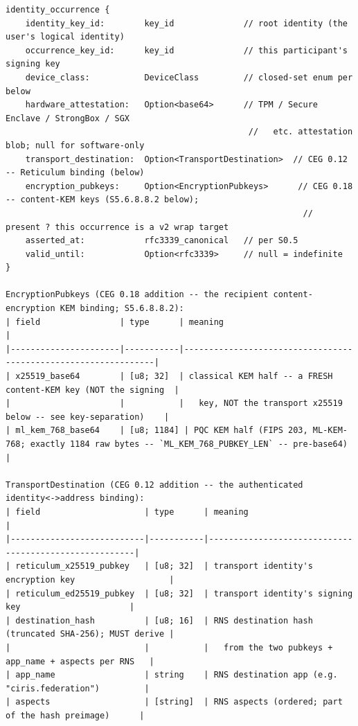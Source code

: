 \documentclass[11pt]{article}
\begin{document}
\begin{lstlisting}
identity_occurrence {
    identity_key_id:        key_id              // root identity (the user's logical identity)
    occurrence_key_id:      key_id              // this participant's signing key
    device_class:           DeviceClass         // closed-set enum per below
    hardware_attestation:   Option<base64>      // TPM / Secure Enclave / StrongBox / SGX
                                                 //   etc. attestation blob; null for software-only
    transport_destination:  Option<TransportDestination>  // CEG 0.12 -- Reticulum binding (below)
    encryption_pubkeys:     Option<EncryptionPubkeys>      // CEG 0.18 -- content-KEM keys (S5.6.8.8.2 below);
                                                            //   present ? this occurrence is a v2 wrap target
    asserted_at:            rfc3339_canonical   // per S0.5
    valid_until:            Option<rfc3339>     // null = indefinite
}

EncryptionPubkeys (CEG 0.18 addition -- the recipient content-encryption KEM binding; S5.6.8.8.2):
| field                | type      | meaning                                                        |
|----------------------|-----------|----------------------------------------------------------------|
| x25519_base64        | [u8; 32]  | classical KEM half -- a FRESH content-KEM key (NOT the signing  |
|                      |           |   key, NOT the transport x25519 below -- see key-separation)    |
| ml_kem_768_base64    | [u8; 1184] | PQC KEM half (FIPS 203, ML-KEM-768; exactly 1184 raw bytes -- `ML_KEM_768_PUBKEY_LEN` -- pre-base64) |

TransportDestination (CEG 0.12 addition -- the authenticated identity<->address binding):
| field                     | type      | meaning                                               |
|---------------------------|-----------|-------------------------------------------------------|
| reticulum_x25519_pubkey   | [u8; 32]  | transport identity's encryption key                   |
| reticulum_ed25519_pubkey  | [u8; 32]  | transport identity's signing key                      |
| destination_hash          | [u8; 16]  | RNS destination hash (truncated SHA-256); MUST derive |
|                           |           |   from the two pubkeys + app_name + aspects per RNS   |
| app_name                  | string    | RNS destination app (e.g. "ciris.federation")         |
| aspects                   | [string]  | RNS aspects (ordered; part of the hash preimage)      |


\end{lstlisting}
\end{document}

